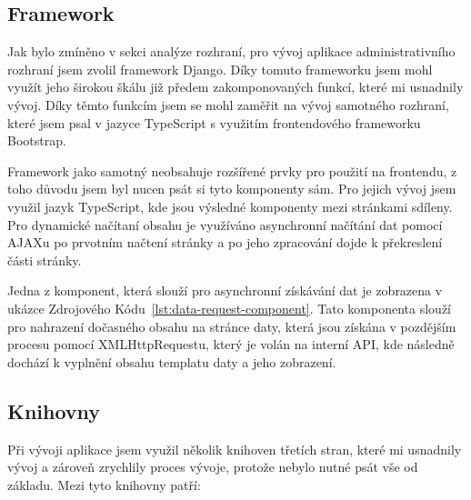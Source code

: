 \subsection{Framework}
\label{subsec:implementation-technologies-framework}
Jak bylo zmíněno v sekci analýze rozhraní, pro vývoj aplikace administrativního rozhraní jsem zvolil framework Django. Díky tomuto frameworku jsem mohl využít jeho širokou škálu již předem zakomponovaných funkcí, které mi usnadnily vývoj. Díky těmto funkcím jsem se mohl zaměřit na vývoj samotného rozhraní, které jsem psal v jazyce TypeScript s využitím frontendového frameworku Bootstrap.

Framework jako samotný neobsahuje rozšířené prvky pro použití na frontendu, z toho důvodu jsem byl nucen psát si tyto komponenty sám. Pro jejich vývoj jsem využil jazyk TypeScript, kde jsou výsledné komponenty mezi stránkami sdíleny. Pro dynamické načítaní obsahu je využíváno asynchronní načítání dat pomocí AJAXu po prvotním načtení stránky a po jeho zpracování dojde k překreslení části stránky.

Jedna z komponent, která slouží pro asynchronní získávání dat je zobrazena v ukázce Zdrojového Kódu~\ref{lst:data-request-component}. Tato komponenta slouží pro nahrazení dočasného obsahu na stránce daty, která jsou získána v pozdějším procesu pomocí XMLHttpRequestu, který je volán na interní API, kde následně dochází k vyplnění obsahu templatu daty a jeho zobrazení.



\subsection{Knihovny}
\label{subsec:implementation-technologies-libraries}
Při vývoji aplikace jsem využil několik knihoven třetích stran, které mi usnadnily vývoj a zároveň zrychlily proces vývoje, protože nebylo nutné psát vše od základu. Mezi tyto knihovny patří:


